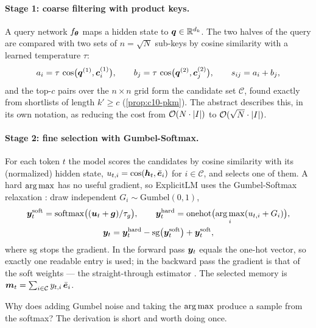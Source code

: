 \paragraph{Stage 1: coarse filtering with product keys.} A query network $f_{\bm{\theta}}$ maps a hidden
state to $\bm{q} \in \mathbb{R}^{d_k}$. The two halves of the query are compared with two sets of
$n = \sqrt{N}$ sub-keys by cosine similarity with a learned temperature $\tau$:
\begin{equation}
  a_i = \tau\, \cos\bigl(\bm{q}^{(1)}, \bm{c}^{(1)}_i\bigr),\qquad
  b_j = \tau\, \cos\bigl(\bm{q}^{(2)}, \bm{c}^{(2)}_j\bigr),\qquad s_{ij} = a_i + b_j ,
  \label{eq:c10-explicit-coarse}
\end{equation}
and the top-$c$ pairs over the $n\times n$ grid form the candidate set $\mathcal{C}$, found exactly
from shortlists of length $k' \ge c$ (\cref{prop:c10-pkm}). The abstract describes this, in its own notation, as reducing
the cost from $\mathcal{O}(N \cdot \left\lvert I\right\rvert)$ to $\mathcal{O}(\sqrt{N}\cdot\left\lvert I\right\rvert)$.

\paragraph{Stage 2: fine selection with Gumbel-Softmax.} For each token $t$ the model scores the
candidates by cosine similarity with its (normalized) hidden state,
$u_{t,i} = \cos(\bm{h}_t, \bar{\bm{e}}_i)$ for $i \in \mathcal{C}$, and selects one of them. A hard
$\operatorname*{arg\,max}$ has no useful gradient, so ExplicitLM uses the Gumbel-Softmax relaxation
\citep{c10-jang2017gumbel,c10-maddison2017concrete}: draw independent $G_i \sim \mathrm{Gumbel}(0,1)$,
\begin{equation}
\begin{gathered}
  \bm{y}^{\mathrm{soft}}_t = \operatorname{softmax}\bigl((\bm{u}_t + \bm{g})/\tau_g\bigr),\qquad
  \bm{y}^{\mathrm{hard}}_t = \mathrm{onehot}\bigl(\operatorname*{arg\,max}_i (u_{t,i} + G_i)\bigr),\\
  \bm{y}_t = \bm{y}^{\mathrm{hard}}_t - \mathrm{sg}\bigl(\bm{y}^{\mathrm{soft}}_t\bigr) + \bm{y}^{\mathrm{soft}}_t ,
\end{gathered}
  \label{eq:c10-gumbel}
\end{equation}
where $\mathrm{sg}$ stops the gradient. In the forward pass $\bm{y}_t$ equals the one-hot vector, so
exactly one readable entry is used; in the backward pass the gradient is that of the soft weights
--- the straight-through estimator \citep{c10-bengio2013ste}. The selected memory is
$\bm{m}_t = \sum_{i\in\mathcal{C}} y_{t,i}\, \bar{\bm{e}}_i$.

Why does adding Gumbel noise and taking the $\operatorname*{arg\,max}$ produce a sample from the softmax? The
derivation is short and worth doing once.


